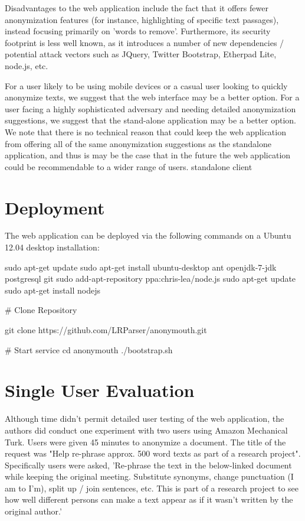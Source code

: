 \documentclass[letterpaper]{article}
\begin{document}
Disadvantages to the web application include the fact that it offers fewer anonymization
features (for instance, highlighting of specific text passages),
instead focusing primarily on 'words to remove'. Furthermore, its
security footprint is less well known, as it introduces a number of
new dependencies / potential attack vectors such as JQuery, Twitter
Bootstrap, Etherpad Lite, node.js, etc.

For a user likely to be using
mobile devices or a casual user looking to quickly anonymize texts,
we suggest that the web interface may be a better option. For a user
facing a highly sophisticated adversary and needing detailed
anonymization suggestions, we suggest that the stand-alone application
may be a better option. We note that there is no technical reason that
could keep the web application from offering all of the same
anonymization suggestions as the standalone application, and thus is
may be the case that in the future the web application could be
recommendable to a wider range of users.
standalone client

\section{Deployment}

The web application can be deployed via the following commands on a
Ubuntu 12.04 desktop installation:

sudo apt-get update
sudo apt-get install ubuntu-desktop ant openjdk-7-jdk postgresql git
sudo add-apt-repository ppa:chris-lea/node.js
sudo apt-get update
sudo apt-get install nodejs

# Clone Repository

git clone https://github.com/LRParser/anonymouth.git

# Start service
cd anonymouth
./bootstrap.sh

\section{Single User Evaluation}

Although time didn't permit detailed user testing of the web
application, the authors did conduct one experiment with two users
using Amazon Mechanical Turk. Users were given 45 minutes to anonymize
a document. The title of the request was "Help re-phrase approx. 500
word texts as part of a research project". Specifically users were
asked, 'Re-phrase the text in the below-linked document while keeping
the original meeting. Substitute synonyms, change punctuation (I am to
I'm), split up / join sentences, etc. This is part of a research
project to see how well different persons can make a text appear as if
it wasn't written by the original author.'
\end{document}
